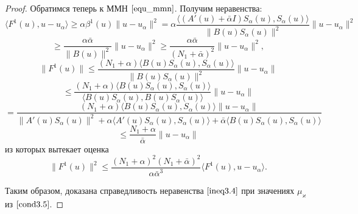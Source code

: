 \begin{proof}
Обратимся теперь к ММН $\eqref{equ_mmn}$. Получим неравенства:
$$\langle F^1(u), u-u_\alpha\rangle\ge\alpha\beta^1(u)\|u-u_\alpha\|^2= \alpha\frac{\langle (A'(u)+\bar\alpha I)S_\alpha (u),S_\alpha (u)\rangle }{\|B(u)S_\alpha (u)\|^2}\|u-u_\alpha\|^2$$
\begin{equation}\label{ineq3.11}
\ge\frac{\alpha\bar\alpha}{\|B(u)\|^2}\|u-u_\alpha\|^2\ge\frac{\alpha\bar\alpha}{(N_1+\bar\alpha)^2}\|u-u_\alpha\|^2,
\end{equation}
$$\|F^1(u)\|\le\frac{(N_1+\alpha)\langle B(u)S_\alpha (u),S_\alpha (u)\rangle }{\|B(u)S_\alpha (u)\|^2}\|u-u_\alpha\|$$
$$\le\frac{(N_1+\alpha)\langle B(u)S_\alpha (u),S_\alpha (u)\rangle }{\langle B(u)S_\alpha (u), B(u)S_\alpha (u)\rangle }\|u-u_\alpha\|$$ 
$$=\frac{(N_1+\alpha)\langle B(u)S_\alpha (u),S_\alpha (u)\rangle \|u-u_\alpha\|}{\|A'(u)S_\alpha (u)\|^2+\alpha\langle A'(u)S_\alpha (u),S_\alpha (u)\rangle +\bar\alpha\langle B(u)S_\alpha (u), S_\alpha (u)\rangle }$$
\begin{equation}\label{ineq3.12}
\le\frac{N_1+\alpha}{\bar\alpha}\|u-u_\alpha\|
\end{equation}
из которых вытекает оценка
$$\|F^1(u)\|^2\le\frac{(N_1+\alpha)^2(N_1+\bar\alpha)^2}{\alpha\bar\alpha^3}\langle F^1(u), u-u_\alpha\rangle.$$

Таким образом, доказана справедливость неравенства $\eqref{ineq3.4}$ при значениях $\mu_\varkappa$ из $\eqref{cond3.5}$.
\end{proof}

